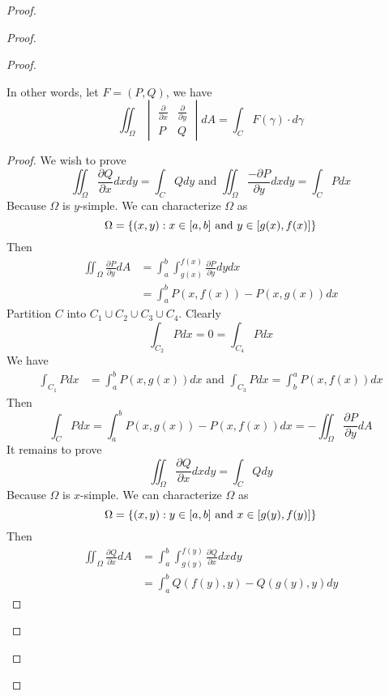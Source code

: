 \documentclass{report}
\begin{document}
\begin{proof}
\begin{proof}
\begin{proof}
\begin{theorem}
In other words, let $F=(P,Q)$, we have 
\begin{equation}
\iint_{\Omega} \begin{vmatrix}
    \frac{\partial}{\partial x} & \frac{\partial}{\partial  y}\\
    P & Q 
\end{vmatrix} dA=\int_{C} F(\gamma )\cdot d\gamma 
\end{equation}
\end{theorem}
\begin{proof}
We wish to prove
\begin{equation}
\iint_{\Omega} \frac{\partial  Q}{\partial x}dxdy=\int_C Qdy\text{ and }\iint_{\Omega} \frac{-\partial P}{\partial y}dxdy=\int_C Pdx
\end{equation}
Because $\Omega$ is $y$-simple. We can characterize $\Omega$ as
\begin{equation}
\Omega=\{ (x,y):x\in [a,b]\text{ and }y\in [g(x),f(x)] \}
\end{equation}
Then
\begin{align}
\iint_\Omega \frac{\partial P}{\partial y}dA&=\int_a^b \int_{g(x)}^{f(x)} \frac{\partial P}{\partial y}dy dx\\
&=\int_a^b P(x,f(x))-P(x,g(x))dx
\end{align}
Partition $C$ into  $C_1\cup C_2\cup C_3\cup C_4$. Clearly
\begin{equation}
\int_{C_2}Pdx=0=\int_{C_4}Pdx
\end{equation}
We have
\begin{align}
\int_{C_1}Pdx&=\int_a^b P(x,g(x))dx\text{ and }\int_{C_3}Pdx=\int_b^a P(x,f(x))dx
\end{align}
Then
\begin{equation}
\int_{C}Pdx=\int_a^b P(x,g(x))-P(x,f(x))dx=-\iint_\Omega \frac{\partial P}{\partial y}dA
\end{equation}
It remains to prove
\begin{equation}
\iint_{\Omega} \frac{\partial Q}{\partial  x}dxdy=\int_C Qdy
\end{equation}
Because $\Omega$ is $x$-simple. We can characterize  $\Omega$ as
\begin{equation}
\Omega=\{ (x,y):y\in [a,b]\text{ and }x\in [g(y),f(y)] \}
\end{equation}
Then
\begin{align}
\iint_\Omega \frac{\partial Q}{\partial x}dA&=\int_a^b\int_{g(y)}^{f(y)} \frac{\partial Q}{\partial x}dxdy\\
&=\int_a^b Q(f(y),y)-Q(g(y),y)dy

\end{align}
\end{proof}
\end{proof}
\end{proof}
\end{proof}
\end{document}
